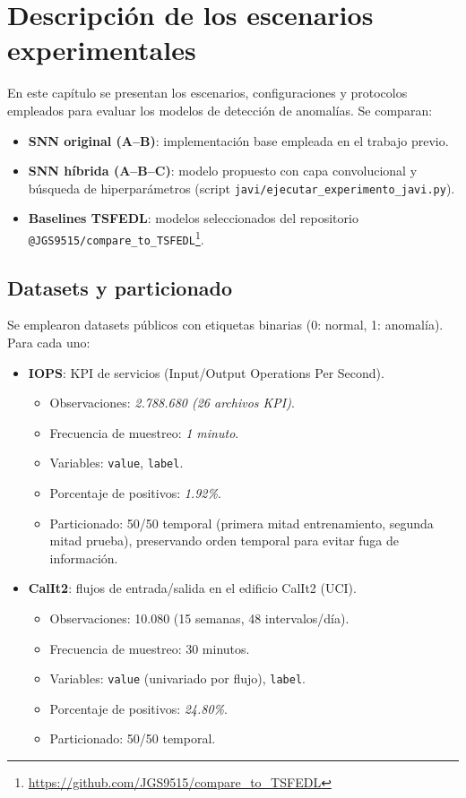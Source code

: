 \section{Descripción de los escenarios experimentales}

En este capítulo se presentan los escenarios, configuraciones y protocolos empleados para evaluar los modelos de detección de anomalías. Se comparan:
\begin{itemize}
    \item \textbf{SNN original (A--B)}: implementación base empleada en el trabajo previo.
    \item \textbf{SNN híbrida (A--B--C)}: modelo propuesto con capa convolucional y búsqueda de hiperparámetros (script \texttt{javi/ejecutar\_experimento\_javi.py}).
    \item \textbf{Baselines TSFEDL}: modelos seleccionados del repositorio \texttt{@JGS9515/compare\_to\_TSFEDL}\footnote{\url{https://github.com/JGS9515/compare_to_TSFEDL}}.
\end{itemize}

\subsection{Datasets y particionado}
Se emplearon datasets públicos con etiquetas binarias (0: normal, 1: anomalía). Para cada uno:
\begin{itemize}
    \item \textbf{IOPS}: KPI de servicios (Input/Output Operations Per Second). 
    \begin{itemize}
        \item Observaciones: \textit{2.788.680 (26 archivos KPI)}.
        \item Frecuencia de muestreo: \textit{1 minuto}.
        \item Variables: \texttt{value}, \texttt{label}.
        \item Porcentaje de positivos: \textit{1.92\%}.
        \item Particionado: 50/50 temporal (primera mitad entrenamiento, segunda mitad prueba), preservando orden temporal para evitar fuga de información.
    \end{itemize}
    \item \textbf{CalIt2}: flujos de entrada/salida en el edificio CalIt2 (UCI).
    \begin{itemize}
        \item Observaciones: 10.080 (15 semanas, 48 intervalos/día).
        \item Frecuencia de muestreo: 30 minutos.
        \item Variables: \texttt{value} (univariado por flujo), \texttt{label}.
        \item Porcentaje de positivos: \textit{24.80\%}.
        \item Particionado: 50/50 temporal. 
    \end{itemize}
\end{itemize}

